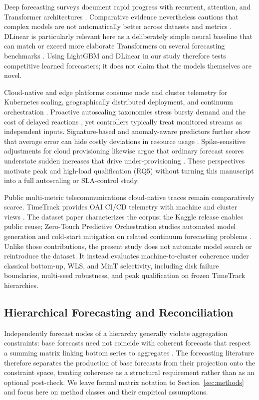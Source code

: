 \documentclass[a4paper,fleqn]{cas-dc}
\begin{document}
Deep forecasting surveys document rapid progress with recurrent, attention, and
Transformer architectures
\cite{lim2021temporal,wen2023transformers}.
Comparative evidence nevertheless cautions that complex models are not
automatically better across datasets and metrics
\cite{makridakis2018statistical,zeng2023dlinear}.
DLinear is particularly relevant here as a deliberately simple neural baseline
that can match or exceed more elaborate Transformers on several forecasting
benchmarks
\cite{zeng2023dlinear}.
Using LightGBM and DLinear in our study therefore tests competitive learned
forecasters; it does not claim that the models themselves are novel.

Cloud-native and edge platforms consume node and cluster telemetry for
Kubernetes scaling, geographically distributed deployment, and continuum
orchestration
\cite{toka2021kubernetes,rossi2020geo,casalicchio2019container}.
Proactive autoscaling taxonomies stress bursty demand and the cost of delayed
reactions
\cite{lorido2014review,qu2018auto},
yet controllers typically treat monitored streams as independent inputs.
Signature-based and anomaly-aware predictors further show that average error can
hide costly deviations in resource usage
\cite{sus2024signature}.
Spike-sensitive adjustments for cloud provisioning likewise argue that ordinary
forecast scores understate sudden increases that drive under-provisioning
\cite{agullo2025spikes}.
These perspectives motivate peak and high-load qualification ({RQ5}) without
turning this manuscript into a full autoscaling or {SLA}-control study.

Public multi-metric telecommunications cloud-native traces remain comparatively
scarce.
TimeTrack provides {OAI} {CI}/{CD} telemetry with machine and cluster views
\cite{meliani2025timetrack,meliani2025timetrackkaggle}.
The dataset paper characterizes the corpus; the Kaggle release enables public
reuse; Zero-Touch Predictive Orchestration studies automated model generation
and cold-start mitigation on related continuum forecasting problems
\cite{meliani2026zerotouch}.
Unlike those contributions, the present study does not automate model search or
reintroduce the dataset.
It instead evaluates machine-to-cluster coherence under classical bottom-up,
{WLS}, and MinT selectivity, including disk failure boundaries, multi-seed
robustness, and peak qualification on frozen TimeTrack hierarchies.

\subsection{Hierarchical Forecasting and Reconciliation}
Independently forecast nodes of a hierarchy generally violate aggregation
constraints: base forecasts need not coincide with coherent forecasts that
respect a summing matrix linking bottom series to aggregates
\cite{hyndman2011optimal,hyndman2021forecasting}.
The forecasting literature therefore separates the production of base forecasts
from their projection onto the constraint space, treating coherence as a
structural requirement rather than as an optional post-check.
We leave formal matrix notation to Section~\ref{sec:methods} and focus here on
method classes and their empirical assumptions.
\end{document}

